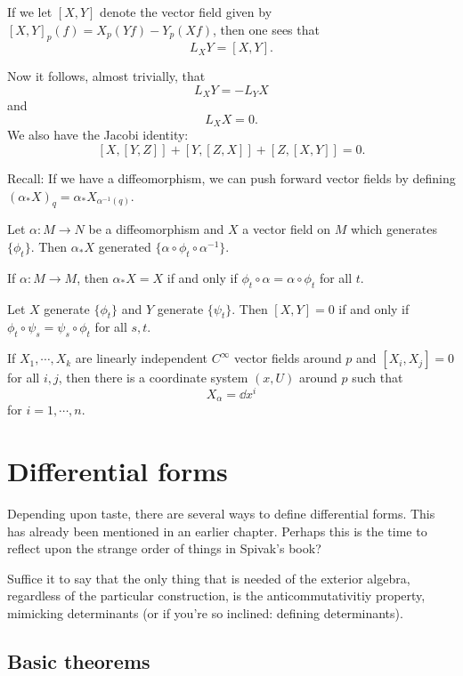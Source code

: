 \documentclass[11pt, english]{article}
\begin{document}
If we let $[X,Y]$ denote the vector field given by $[X,Y]_p(f)=X_p(Yf)-Y_p(Xf)$, then one sees that
\[
L_XY = [X,Y].
\]

Now it follows, almost trivially, that
\[
L_XY = -L_YX
\]
and
\[
L_XX=0.
\]
We also have the Jacobi identity:
\[
[X,[Y,Z]] + [Y,[Z,X]]+[Z,[X,Y]] = 0.
\]

Recall: If we have a diffeomorphism, we can push forward vector fields by defining $(\alpha_\ast X)_q = \alpha_\ast X_{\alpha^{-1}(q)}$.

\begin{lemma}
 Let $\alpha:M \to N$ be a diffeomorphism and $X$ a vector field on $M$ which generates $\{ \phi_t \}$. Then $\alpha_\ast X$ generated $\{ \alpha \circ \phi_t \circ \alpha^{-1}\}$.
\end{lemma}

\begin{corr}
  If $\alpha:M \to M$, then $\alpha_\ast X = X$ if and only if $\phi_t \circ \alpha = \alpha \circ \phi_t$ for all $t$.
\end{corr}

\begin{lemma}
 Let $X$ generate $\{ \phi_t \}$ and $Y$ generate $\{ \psi_t \}$. Then $[X,Y]=0$ if and only if $\phi_t \circ \psi_s = \psi_s \circ \phi_t$ for all $s,t$.
\end{lemma}

\begin{thm}
 If $X_1,\cdots,X_k$ are linearly independent $C^\infty$ vector fields around $p$ and $[X_i,X_j]=0$ for all $i,j$, then there is a coordinate system $(x,U)$ around $p$ such that
\[
X_\alpha = \dd{}{x^i}
\]
for $i=1,\cdots,n$. 
\end{thm}

\newpage
\section{Differential forms}

Depending upon taste, there are several ways to define differential forms. This has already been mentioned in an earlier chapter. Perhaps this is the time to reflect upon the strange order of things in Spivak's book?

Suffice it to say that the only thing that is needed of the exterior algebra, regardless of the particular construction, is the anticommutativitiy property, mimicking determinants (or if you're so inclined: defining determinants).

\subsection{Basic theorems}
\end{document}
